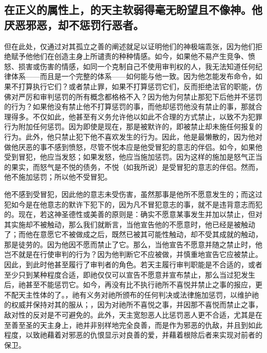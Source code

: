 \subsection{在正义的属性上，的天主软弱得毫无盼望且不像神。他厌恶邪恶，却不惩罚行恶者。}

但在此处，仅通过对其孤立之善的阐述就足以证明他们的神极端乖张，因为他们拒绝赋予他他们在创造主身上所谴责的种种情感。如今，如果他不易产生竞争、愤怒、损害或伤害的情感，如同一个克制自己不使用审判权的人，我无法知道任何纪律体系——而且是一个完整的体系——如何能与他一致。因为他怎能发布命令，如果不打算执行它们？或者禁止罪，如果不打算惩罚它们，反而拒绝法官的职能，仿佛对严厉和审判惩罚的所有概念都格格不入？因为他为何禁止那犯下后他并不惩罚的行为？如果他没有禁止他不打算惩罚的事，而他却惩罚他没有禁止的事，那就合理得多。不仅如此，他甚至有义务允许他以如此不合理的方式禁止，以致不为犯罪行为附加任何惩罚。因为即使是现在，那是被默许的，即被禁止却未施任何报复的行为。此外，他只禁止犯下他不喜欢发生的行为。因此，他是最懒散的，因为他对做他厌恶的事不感到愤怒，尽管不悦本应是他受冒犯的意志的伴侣。如今，如果他受到冒犯，他应当发怒；如果发怒，他应当施加惩罚。因为这样的施加是怒气正当的果实，而怒气是不悦的债务，不悦（如我所说）是受冒犯的意志的伴侣。然而，他不施加惩罚；所以他不受冒犯。\par

他不感到受冒犯，因此他的意志未受伤害，虽然那事是他所不愿意发生的；而这过犯如今是在他意志的默许下犯下的，因为凡不冒犯意志的事，就不是违背意志而犯的。现在，若这神圣德性或美善的原则是：确实不愿意某事发生并加以禁止，但对其实施却不被触动，那么我们就断言，当他宣告他的不愿意时，他已经是被触动了；而他在意愿它不被做成之后，既然已被其可能性触动，却不受其成就的触动，那是徒劳的。因为他因不愿而禁止了它。那么，当他宣告不愿意并随之禁止时，他岂不就是在行使审判的行为？因为他判断它不应被做，并慎重地宣告它应被禁止。因此，到此时他甚至履行了审判者的角色。若天主履行审判职能是不合适的，或者至少只到某种程度合适，即祂仅仅可以宣告不愿意并宣布禁止，那么当过犯发生后，祂甚至不能惩罚它。如今，再没有比不执行祂所不喜悦并禁止之事的报应，更不配天主性体的了。，祂有义务对祂所颁布的任何判决或法律施加惩罚，以维护祂的权威并保持对其的服从；，因为对祂所不喜悦之事，并因那不喜悦而禁止之事，敌对性的反对是不可避免的。此外，天主宽恕恶人比惩罚恶人更不合适，尤其是在至善至圣的天主身上，祂并非别样地完全良善，而是作为邪恶的仇敌，并且到如此程度，以致祂藉着对邪恶的仇恨显示对良善的爱，并藉着根除后者来实现对前者的保卫。\par


